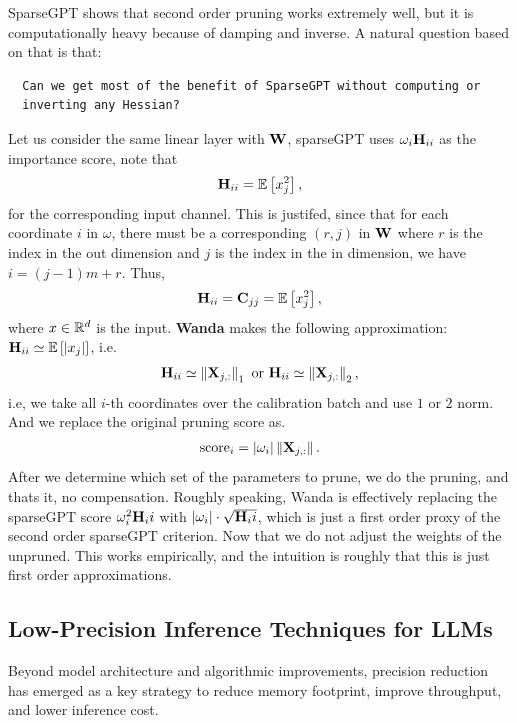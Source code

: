 \documentclass[11pt]{article}  %
\begin{document}
SparseGPT shows that second order pruning works extremely well, but it is computationally heavy because of damping and inverse.
A natural question based on that is that: 
\begin{verbatim}
  Can we get most of the benefit of SparseGPT without computing or
  inverting any Hessian?
\end{verbatim}
Let us consider the same linear layer with $\mathbf{W}$, sparseGPT uses $\omega_i \mathbf{H}_{ii}$ as the importance score, note that 
\begin{align*}
  \mathbf{H}_{ii} = \mathbb{E}\left[x_j^2\right], 
\end{align*}
for the corresponding input channel.
This is justifed, since that for each coordinate $i$ in $\omega$, there must be a corresponding $(r, j)$ in $\mathbf{W}$ where $r$ is the index in the out dimension and $j$ is the index in the in dimension, we have $i = (j-1)m + r$.
Thus, 
\begin{align*}
  \mathbf{H}_{ii} = \mathbf{C}_{jj} = \mathbb{E}\left[x_j^2\right],
\end{align*}
where $x \in \mathbb{R}^d$ is the input.
\textbf{Wanda} makes the following approximation: $\mathbf{H}_{ii} \simeq \mathbb{E}\left[\lvert x_j \rvert\right]$, i.e. 
\begin{align*}
  \mathbf{H}_{ii} \simeq \left\lVert \mathbf{X}_{j,:} \right\rVert_1 \text{    or   } \mathbf{H}_{ii} \simeq \left\lVert \mathbf{X}_{j,:} \right\rVert_2,
\end{align*} 
i.e, we take all $i$-th coordinates over the calibration batch and use $1$ or $2$ norm.
And we replace the original pruning score as. 
\begin{align*}
  \text{score}_i = \lvert \omega_i \rvert \left\lVert \mathbf{X}_{j,:} \right\rVert.
\end{align*}
After we determine which set of the parameters to prune, we do the pruning, and thats it, no compensation. 
Roughly speaking, Wanda is effectively replacing the sparseGPT score $\omega^2_i \mathbf{H}_ii$ with $\lvert\omega_i\rvert \cdot \sqrt{\mathbf{H}_ii}$, which is just a first order proxy of the second order sparseGPT criterion.
Now that we do not adjust the weights of the unpruned.
This works empirically, and the intuition is roughly that this is just first order approximations.


\subsection{Low-Precision Inference Techniques for LLMs}

Beyond model architecture and algorithmic improvements, precision reduction has emerged as a key strategy to reduce memory footprint, improve throughput, and lower inference cost.
\end{document}
